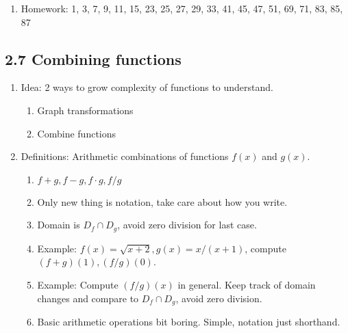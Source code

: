 \documentclass{article}
\begin{document}
\begin{enumerate}
\item Homework: 1, 3, 7, 9, 11, 15, 23, 25, 27, 29, 33, 41, 45, 47, 51, 69, 71, 83, 85, 87
\end{enumerate}

\subsection{2.7 Combining functions}

\begin{enumerate}
\item Idea: 2 ways to grow complexity of functions to understand.
\begin{enumerate}
\item Graph transformations
\item Combine functions
\end{enumerate}

\item Definitions: Arithmetic combinations of functions $f(x)$ and $g(x)$.
\begin{enumerate}
\item $f+g, f-g, f \cdot g, f/g$
\item Only new thing is notation, take care about how you write.
\item Domain is $D_f \cap D_g$, avoid zero division for last case.
\item Example: $f(x)=\sqrt{x+2}, g(x) = x/(x+1)$, compute $(f+g)(1), (f/g)(0)$.
\item Example: Compute $(f/g)(x)$ in general. Keep track of domain changes and compare to $D_f \cap D_g$, avoid zero division.
\item Basic arithmetic operations bit boring. Simple, notation just shorthand. 
\end{enumerate}


\end{enumerate}
\end{document}
